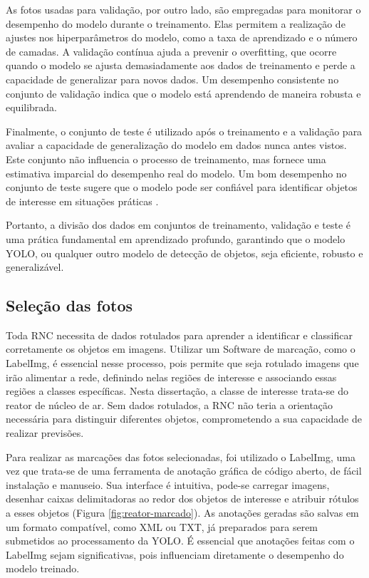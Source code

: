 As fotos usadas para validação, por outro lado, são empregadas para monitorar o desempenho do modelo durante o treinamento. Elas permitem a realização de ajustes nos hiperparâmetros do modelo, como a taxa de aprendizado e o número de camadas. A validação contínua ajuda a prevenir o overfitting, que ocorre quando o modelo se ajusta demasiadamente aos dados de treinamento e perde a capacidade de generalizar para novos dados. Um desempenho consistente no conjunto de validação indica que o modelo está aprendendo de maneira robusta e equilibrada.

Finalmente, o conjunto de teste é utilizado após o treinamento e a validação para avaliar a capacidade de generalização do modelo em dados nunca antes vistos. Este conjunto não influencia o processo de treinamento, mas fornece uma estimativa imparcial do desempenho real do modelo. Um bom desempenho no conjunto de teste sugere que o modelo pode ser confiável para identificar objetos de interesse em situações práticas \cite{goodfellow2016deep}.

Portanto, a divisão dos dados em conjuntos de treinamento, validação e teste é uma prática fundamental em aprendizado profundo, garantindo que o modelo YOLO, ou qualquer outro modelo de detecção de objetos, seja eficiente, robusto e generalizável.

\subsection{Seleção das fotos}

Toda RNC necessita de dados rotulados para aprender a identificar e classificar corretamente os objetos em imagens. Utilizar um Software de marcação, como o LabelImg, é essencial nesse processo, pois permite que seja rotulado imagens que irão alimentar a rede, definindo nelas regiões de interesse e associando essas regiões a classes específicas. Nesta dissertação, a classe de interesse trata-se do reator de núcleo de ar. Sem dados rotulados, a RNC não teria a orientação necessária para distinguir diferentes objetos, comprometendo a sua capacidade de realizar previsões.

Para realizar as marcações das fotos selecionadas, foi utilizado o LabelImg, uma vez que trata-se de uma ferramenta de anotação gráfica de código aberto, de fácil instalação e manuseio. Sua interface é intuitiva, pode-se carregar imagens, desenhar caixas delimitadoras ao redor dos objetos de interesse e atribuir rótulos a esses objetos (Figura \ref{fig:reator-marcado}). As anotações geradas são salvas em um formato compatível, como XML ou TXT, já preparados para serem submetidos ao processamento da YOLO. É essencial que anotações feitas com o LabelImg sejam significativas, pois influenciam diretamente o desempenho do modelo treinado.

